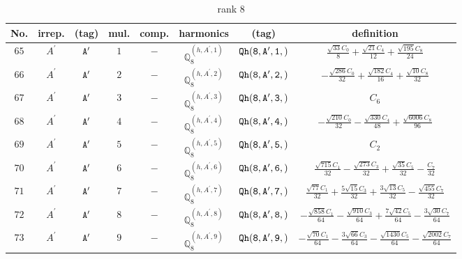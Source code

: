 \documentclass[fleqn,8pt]{jsarticle}
\begin{document}
\begin{table}[ht!]
\begin{center}
\caption{rank 8}
\renewcommand{\arraystretch}{1.3}
\begin{tabular}{cccccccc} \hline \hline
No. & irrep. & (tag) & mul. & comp. & harmonics & (tag) & definition \\ \hline
$ 65 $ & $ A^{\prime} $ & $ {\tt A'} $ & $ 1 $ & $ - $ & $ \mathbb{Q}_{8}^{(h,A^{\prime},1)} $ & $ {\tt Qh(8,A',1,)} $ & $ \frac{\sqrt{33} C_{0}}{8} + \frac{\sqrt{21} C_{4}}{12} + \frac{\sqrt{195} C_{8}}{24} $ \\
$ 66 $ & $ A^{\prime} $ & $ {\tt A'} $ & $ 2 $ & $ - $ & $ \mathbb{Q}_{8}^{(h,A^{\prime},2)} $ & $ {\tt Qh(8,A',2,)} $ & $ - \frac{\sqrt{286} C_{0}}{32} + \frac{\sqrt{182} C_{4}}{16} + \frac{\sqrt{10} C_{8}}{32} $ \\
$ 67 $ & $ A^{\prime} $ & $ {\tt A'} $ & $ 3 $ & $ - $ & $ \mathbb{Q}_{8}^{(h,A^{\prime},3)} $ & $ {\tt Qh(8,A',3,)} $ & $ C_{6} $ \\
$ 68 $ & $ A^{\prime} $ & $ {\tt A'} $ & $ 4 $ & $ - $ & $ \mathbb{Q}_{8}^{(h,A^{\prime},4)} $ & $ {\tt Qh(8,A',4,)} $ & $ - \frac{\sqrt{210} C_{0}}{32} - \frac{\sqrt{330} C_{4}}{48} + \frac{\sqrt{6006} C_{8}}{96} $ \\
$ 69 $ & $ A^{\prime} $ & $ {\tt A'} $ & $ 5 $ & $ - $ & $ \mathbb{Q}_{8}^{(h,A^{\prime},5)} $ & $ {\tt Qh(8,A',5,)} $ & $ C_{2} $ \\
$ 70 $ & $ A^{\prime} $ & $ {\tt A'} $ & $ 6 $ & $ - $ & $ \mathbb{Q}_{8}^{(h,A^{\prime},6)} $ & $ {\tt Qh(8,A',6,)} $ & $ \frac{\sqrt{715} C_{1}}{32} - \frac{\sqrt{273} C_{3}}{32} + \frac{\sqrt{35} C_{5}}{32} - \frac{C_{7}}{32} $ \\
$ 71 $ & $ A^{\prime} $ & $ {\tt A'} $ & $ 7 $ & $ - $ & $ \mathbb{Q}_{8}^{(h,A^{\prime},7)} $ & $ {\tt Qh(8,A',7,)} $ & $ \frac{\sqrt{77} C_{1}}{32} + \frac{5 \sqrt{15} C_{3}}{32} + \frac{3 \sqrt{13} C_{5}}{32} - \frac{\sqrt{455} C_{7}}{32} $ \\
$ 72 $ & $ A^{\prime} $ & $ {\tt A'} $ & $ 8 $ & $ - $ & $ \mathbb{Q}_{8}^{(h,A^{\prime},8)} $ & $ {\tt Qh(8,A',8,)} $ & $ - \frac{\sqrt{858} C_{1}}{64} - \frac{\sqrt{910} C_{3}}{64} + \frac{7 \sqrt{42} C_{5}}{64} - \frac{3 \sqrt{30} C_{7}}{64} $ \\
$ 73 $ & $ A^{\prime} $ & $ {\tt A'} $ & $ 9 $ & $ - $ & $ \mathbb{Q}_{8}^{(h,A^{\prime},9)} $ & $ {\tt Qh(8,A',9,)} $ & $ - \frac{\sqrt{70} C_{1}}{64} - \frac{3 \sqrt{66} C_{3}}{64} - \frac{\sqrt{1430} C_{5}}{64} - \frac{\sqrt{2002} C_{7}}{64} $ \\

\end{tabular}
\end{center}
\end{table}
\end{document}
